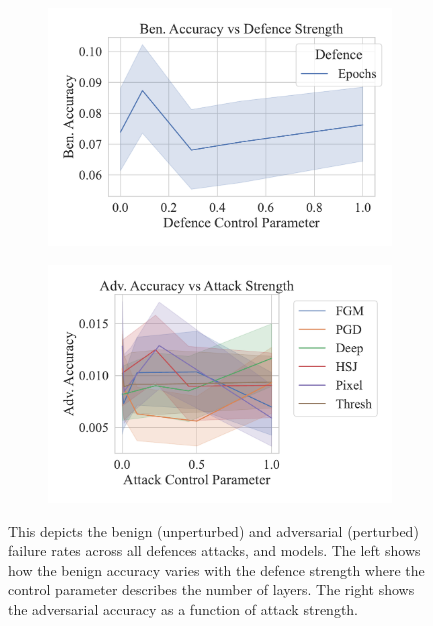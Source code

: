 \begin{figure}[h!]
    \centering
    \begin{subfigure}[]{0.45\textwidth}
        \centering
        \includegraphics[width=\textwidth]{cifar100/def_param_vs_accuracy.pdf}
    \end{subfigure}
    \begin{subfigure}[]{0.45\textwidth}
        \centering
        \includegraphics[width=\textwidth]{cifar100/atk_param_vs_accuracy.pdf}
    \end{subfigure}
    \caption{This depicts the benign (unperturbed) and adversarial (perturbed) failure rates across all defences attacks, and models. The left shows how the benign accuracy varies with the defence strength where the control parameter describes the number of layers. The right shows the adversarial accuracy as a function of attack strength.}
    \label{fig:cifar100_strength}
\end{figure}

